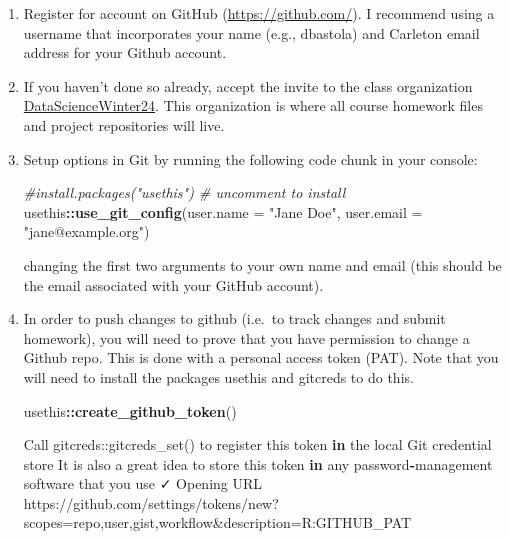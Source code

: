 \documentclass[
]{book}
\newenvironment{Shaded}{\begin{snugshade}}{\end{snugshade}}
\newcommand{\AttributeTok}[1]{\textcolor[rgb]{0.13,0.29,0.53}{#1}}
\newcommand{\CommentTok}[1]{\textcolor[rgb]{0.56,0.35,0.01}{\textit{#1}}}
\newcommand{\ControlFlowTok}[1]{\textcolor[rgb]{0.13,0.29,0.53}{\textbf{#1}}}
\newcommand{\FunctionTok}[1]{\textcolor[rgb]{0.13,0.29,0.53}{\textbf{#1}}}
\newcommand{\NormalTok}[1]{#1}
\newcommand{\SpecialCharTok}[1]{\textcolor[rgb]{0.81,0.36,0.00}{\textbf{#1}}}
\newcommand{\StringTok}[1]{\textcolor[rgb]{0.31,0.60,0.02}{#1}}
\begin{document}
\begin{enumerate}
\def\labelenumi{\arabic{enumi}.}
\item
  Register for account on GitHub (\url{https://github.com/}). I recommend
  using a username that incorporates your name (e.g., dbastola) and Carleton email address for your Github account.
\item
  If you haven't done so already, accept the invite to the class organization \href{https://github.com/DataScienceWinter24}{DataScienceWinter24}. This organization is where all course homework files and project repositories will live.
\item
  Setup options in Git by running the following code chunk in your
  console:

\begin{Shaded}
\begin{Highlighting}[]
\CommentTok{\#install.packages("usethis")  \# uncomment to install}
\NormalTok{usethis}\SpecialCharTok{::}\FunctionTok{use\_git\_config}\NormalTok{(}\AttributeTok{user.name =} \StringTok{"Jane Doe"}\NormalTok{, }\AttributeTok{user.email =} \StringTok{"jane@example.org"}\NormalTok{)}
\end{Highlighting}
\end{Shaded}

  changing the first two arguments to your own name and email (this should
  be the email associated with your GitHub account).
\item
  In order to push changes to github (i.e.~to track changes and submit homework), you will need to prove that you have permission to change a Github repo. This is done with a personal access token (PAT). Note that you will need to install the packages usethis and gitcreds to do this.

\begin{Shaded}
\begin{Highlighting}[]
\NormalTok{usethis}\SpecialCharTok{::}\FunctionTok{create\_github\_token}\NormalTok{()}
\end{Highlighting}
\end{Shaded}

\begin{Shaded}
\begin{Highlighting}[]
\NormalTok{ Call }\StringTok{\textasciigrave{}}\AttributeTok{gitcreds::gitcreds\_set()}\StringTok{\textasciigrave{}}\NormalTok{ to register this token }\ControlFlowTok{in}\NormalTok{ the local Git credential store}
\NormalTok{ It is also a great idea to store this token }\ControlFlowTok{in}\NormalTok{ any password}\SpecialCharTok{{-}}\NormalTok{management software that you use}
\NormalTok{ ✓ Opening URL }\StringTok{\textquotesingle{}https://github.com/settings/tokens/new?scopes=repo,user,gist,workflow\&description=R:GITHUB\_PAT\textquotesingle{}}
\end{Highlighting}
\end{Shaded}


\end{enumerate}
\end{document}
